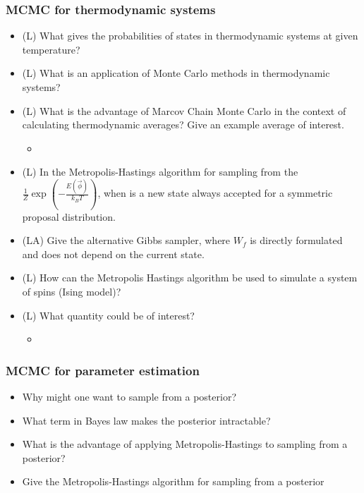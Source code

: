 \subsubsection*{MCMC for thermodynamic systems}

\begin{itemize}
    \item (L) What gives the probabilities of states in thermodynamic systems at given temperature?
    \item (L) What is an application of Monte Carlo methods in thermodynamic systems?
    \item (L) What is the advantage of Marcov Chain Monte Carlo in the context of calculating thermodynamic averages? Give an example average of interest.
    \begin{itemize}
        \item {}
    \end{itemize}
    \item (L) In the Metropolis-Hastings algorithm for sampling from the $\frac{1}{Z} \exp \left( - \frac{E(\vec{\phi})}{k_B T} \right)$, when
    is a new state always accepted for a symmetric proposal distribution.
    \item (LA) Give the alternative Gibbs sampler, where $W_f$ is directly formulated and does not depend on the current state.
    \item (L) How can the Metropolis Hastings algorithm be used to simulate a system of spins (Ising model)?
    \item (L) What quantity could be of interest?
    \begin{itemize}
        \item {}
    \end{itemize}
\end{itemize}

\subsubsection*{MCMC for parameter estimation}

\begin{itemize}
    \item Why might one want to sample from a posterior?
    \item What term in Bayes law makes the posterior intractable?
    \item What is the advantage of applying Metropolis-Hastings to sampling from a posterior?
    \item Give the Metropolis-Hastings algorithm for sampling from a posterior
\end{itemize}

